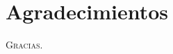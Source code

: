 \chapter*{Agradecimientos}
   
   \lettrine[lines=9] {\initfamily  \selectfont G}{racias.} \blindtext
   
   \blindtext

\blindtext

\blindtext

\blindtext